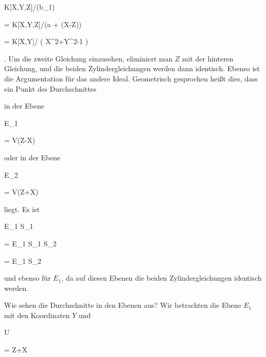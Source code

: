 {{\vergleichskette


{ K[X,Y,Z]/({\mathfrak b}_1)
}


{ =} { K[X,Y,Z]/({\mathfrak a} + (X-Z))
}


{ =} { K[X,Y]/ \left(  X^2+Y^2-1  \right)
}


{ } {
}


{ } {
}


}
{}{}{.}
Um die zweite Gleichung einzusehen, eliminiert man $Z$ mit der hinteren Gleichung, und die beiden Zylindergleichungen werden dann identisch. Ebenso ist die Argumentation für das andere Ideal. Geometrisch gesprochen heißt dies, dass ein Punkt des Durchschnittes


 in der Ebene


\mavergleichskette


{\vergleichskette


{ E_1
}


{ = }{ V(Z-X)
}


{  }{
}


{    }{
}


{   }{
}


}
{}{}{}
oder in der Ebene


\mavergleichskette


{\vergleichskette


{ E_2
}


{ = }{ V(Z+X)
}


{  }{
}


{    }{
}


{   }{
}


}
{}{}{}
liegt. Es ist


\mavergleichskettedisp


{\vergleichskette


{ E_1 \cap S_1
}


{ =} { E_1 \cap S_1 \cap S_2
}


{ =} { E_1 \cap S_2
}


{ } {
}


{ } {
}


}
{}{}{}
und ebenso für $E_1$, da auf diesen Ebenen die beiden Zylindergleichungen identisch werden.


Wie sehen die Durchschnitte in den Ebenen aus? Wir betrachten die Ebene $E_1$ mit den Koordinaten $Y$ und


\mavergleichskette


{\vergleichskette


{ U
}


{ = }{ Z+X
}


}}
